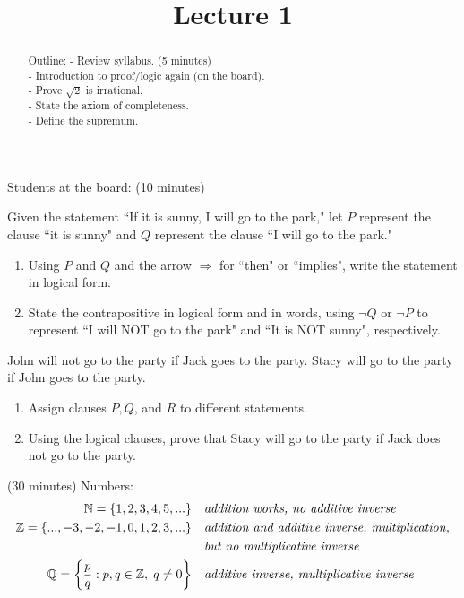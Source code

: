 \documentclass{ximera}
\begin{document}
    \title{Lecture 1}
    
    \begin{abstract}  
    Outline:
    - Review syllabus. (5 minutes)\\
    - Introduction to proof/logic again (on the board).\\
    - Prove $\sqrt{2}$ is irrational.\\
    - State the axiom of completeness.\\
    - Define the supremum.
\end{abstract}

\maketitle

Students at the board: (10 minutes)
\begin{exercise}
    Given the statement ``If it is sunny, I will go to the park," let $P$ represent the clause ``it is sunny" and $Q$ represent the clause ``I will go to the park."
\begin{enumerate}
    \item Using $P$ and $Q$ and the arrow $\Rightarrow$ for ``then" or ``implies", write the statement in logical form.
    \item State the contrapositive in logical form and in words, using $\neg Q$ or $\neg P$ to represent ``I will NOT go to the park" and ``It is NOT sunny", respectively. 
\end{enumerate}
\end{exercise}

\begin{exercise}
    John will not go to the party if Jack goes to the party.  Stacy will go to the party if John goes to the party.
    \begin{enumerate}
        \item Assign clauses $P, Q$, and $R$ to different statements.
        \item Using the logical clauses, prove that Stacy will go to the party if Jack does not go to the party.
    \end{enumerate}
\end{exercise}

(30 minutes)
Numbers:
\begin{align*}
    \mathbb{N} = \{ 1, 2, 3, 4, 5, ...\} &\quad \text{\textit{addition works, no additive inverse}} \\
    \mathbb{Z} = \{..., -3, -2, -1, 0, 1, 2, 3 ,...\} &\quad \text{\textit{addition and additive inverse, multiplication,}}
    \\
    \phantom{ \mathbb{Z} = \{..., -3, -2, -1, 0, 1, 2, 3 ,...\}} &\quad \text{\textit{but no multiplicative inverse}}
    \\
    \mathbb{Q} = \left\{\frac{p}{q} : p,q \in \mathbb{Z}, \; q\neq 0\right\} &\quad \text{\textit{additive inverse, multiplicative inverse}}
\end{align*}
\end{document}
